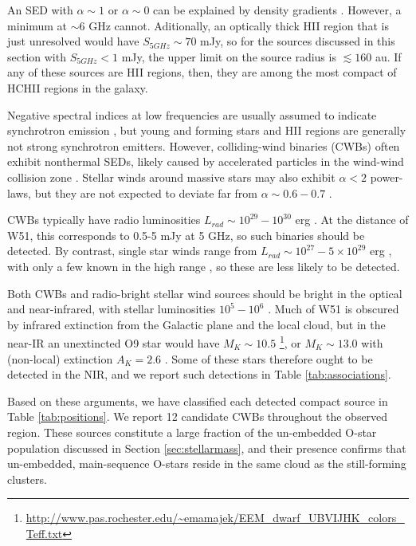 An SED with $\alpha\sim1$ or $\alpha\sim0$ can be explained by density
gradients \citep{Keto2008a,Galvan-Madrid2009a}. However, a minimum at $\sim6$
GHz cannot.  Aditionally, an optically thick HII region that is just unresolved
would have $S_{5 GHz} \sim 70$ mJy, so for the sources discussed in this
section with $S_{5 GHz} < 1$ mJy, the upper limit on the source radius is
$\lesssim160$ au.  If any of these sources are HII regions, then, they are
among the most compact of HCHII regions in the galaxy.




Negative spectral indices at low frequencies are usually assumed to indicate
synchrotron emission \citep{Wilson2009a,Condon2007a}, but young and forming
stars and HII regions are generally not strong synchrotron emitters.  However,
colliding-wind binaries (CWBs) often exhibit nonthermal SEDs, likely caused by
accelerated particles in the wind-wind collision zone \citep{De-Becker2013a}.
Stellar winds around massive stars may also exhibit $\alpha<2$ power-laws, but
they are not expected to deviate far from $\alpha\sim0.6-0.7$
\citep{Wright1975a,Panagia1975b,Reynolds1986a}.

CWBs typically have radio luminosities
$L_{rad}\sim10^{29}-10^{30}$ erg \pers \citep{De-Becker2013a}.   At the
distance of W51, this corresponds to 0.5-5 mJy at 5 GHz, so such binaries
should be detected.  By contrast, single star winds range from $L_{rad} \sim
10^{27}-5\times10^{29}$ erg \pers, with only a few known in the high range
\citep{Bieging1989a}, so these are less likely to be detected.

Both CWBs and radio-bright stellar wind sources should be bright in the
optical and near-infrared, with stellar luminosities $10^5-10^6$ \lsun.
Much of W51 is obscured by infrared extinction from the Galactic plane
and the local cloud, but in the near-IR an unextincted O9 star would have
$M_K\sim10.5$
\citep{Pecaut2013a}\footnote{\url{http://www.pas.rochester.edu/~emamajek/EEM_dwarf_UBVIJHK_colors_Teff.txt}},
or $M_K\sim 13.0$ with (non-local) extinction $A_K=2.6$ \citep{Goldader1994a}.
Some of these stars therefore ought to be detected in the NIR, and we
report such detections in Table \ref{tab:associations}.

Based on these arguments, we have classified each detected compact source in
Table \ref{tab:positions}.  We report 12 candidate CWBs throughout the observed
region.  These sources constitute a large fraction of the un-embedded O-star
population discussed in Section \ref{sec:stellarmass}, and their presence confirms
that un-embedded, main-sequence O-stars reside in the same cloud as the still-forming
clusters.


